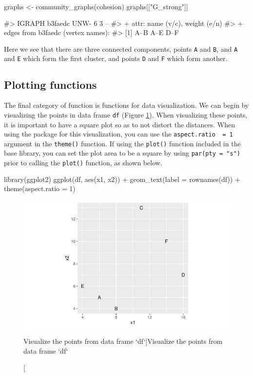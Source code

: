 \begin{Schunk}
\begin{Sinput}
graphs <- community_graphs(cohesion)
graphs[["G_strong"]]
\end{Sinput}
\begin{Soutput}
#> IGRAPH b3faedc UNW- 6 3 -- 
#> + attr: name (v/c), weight (e/n)
#> + edges from b3faedc (vertex names):
#> [1] A--B A--E D--F
\end{Soutput}
\end{Schunk}

Here we see that there are three connected components, points \texttt{A}
and \texttt{B}, and \texttt{A} and \texttt{E} which form the first
cluster, and points \texttt{D} and \texttt{F} which form another.

\hypertarget{plotting-functions}{%
\subsection{Plotting functions}\label{plotting-functions}}

The final category of function is functions for data visualization. We
can begin by visualizing the points in data frame \texttt{df} (Figure
\ref{fig:fig1}). When visualizing these points, it is important to have
a square plot so as to not distort the distances. When using the
 package for this visualization, you can use the
\texttt{aspect.ratio\ \ =\ 1} argument in the \texttt{theme()} function.
If using the \texttt{plot()} function included in the base library, you
can set the plot area to be a square by using \texttt{par(pty\ =\ "s")}
prior to calling the \texttt{plot()} function, as shown below.

\begin{Schunk}
\begin{Sinput}
library(ggplot2)
ggplot(df, aes(x1, x2)) +
  geom_text(label = rownames(df)) + 
  theme(aspect.ratio = 1)
\end{Sinput}
\begin{figure}
\includegraphics{manuscript_files/figure-latex/fig1-1} \caption[Visualize the points from data frame `df`]{Visualize the points from data frame `df`}\label{fig:fig1}
\end{figure}
\end{Schunk}

